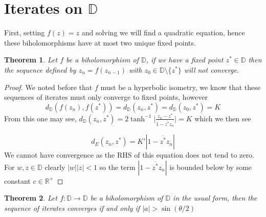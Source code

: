 \documentclass{article}
\newcommand{\R}{\mathbb{R}}
\newcommand{\DD}{\mathbb{D}}
\newtheorem{theorem}{Theorem}
\begin{document}
\section{Iterates on $\DD$}
First, setting $f(z) = z$ and solving we will find a quadratic equation, hence these biholomorphisms have at most two unique fixed points.
\begin{theorem}
    Let $f$ be a biholomorphism of $\DD$, if we have a fixed point $z^*\in\DD$ then the sequence defined by $z_n = f(z_{n-1})$ with $z_0\in\DD\setminus\{z^*\}$ will not converge.
\end{theorem}
\begin{proof}
    We noted before that $f$ must be a hyperbolic isometry, we know that these sequences of iterates must only converge to fixed points, however
    \begin{equation*}
        d_\DD(f(z_n), f(z^*)) = d_\DD(z_n, z^*) = d_\DD(z_0, z^*) = K
    \end{equation*}
    From this one may see, $d_\DD(z_n, z^*) = 2 \tanh^{-1}\bigg|\frac{z_n - z^*}{1-\overline{z^*}z_n} \bigg|  = K$ which we then see 

    \begin{equation*}
        d_E(z_n, z^*) = K'|1-\overline{z^*}z_n|
    \end{equation*}
    We cannot have convergence as the RHS of this equation does not tend to zero. For $w, z\in\DD$ clearly $|w||z| < 1$ so the term $|1-\overline{z^*}z_n|$ is bounded below by some constant $c\in\R^+$
\end{proof}
\begin{theorem}
    Let $f:\DD\to\DD$ be a biholomorphism of $\DD$ in the usual form, then the sequence of iterates converges if and only if $|a| > \sin(\theta/2)$
\end{theorem}
\end{document}
